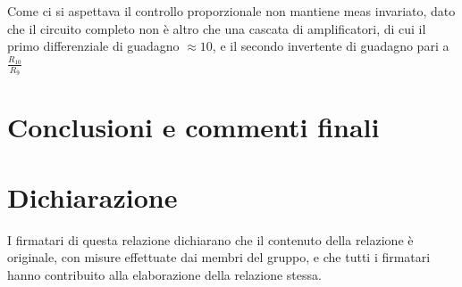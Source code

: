 \documentclass[10pt, a4paper, italian]{article}
\begin{document}
Come ci si aspettava il controllo proporzionale non mantiene meas invariato, dato che il circuito completo non è altro che una cascata di amplificatori, di cui il primo differenziale di guadagno $\approx 10$, e il secondo invertente di guadagno pari a $\frac{R_{10}}{R_9}$
\section*{Conclusioni e commenti finali}


\section*{Dichiarazione}
I firmatari di questa relazione dichiarano che il contenuto della relazione \`e
originale, con misure effettuate dai membri del gruppo, e che tutti i firmatari
hanno contribuito alla elaborazione della relazione stessa.
\end{document}
